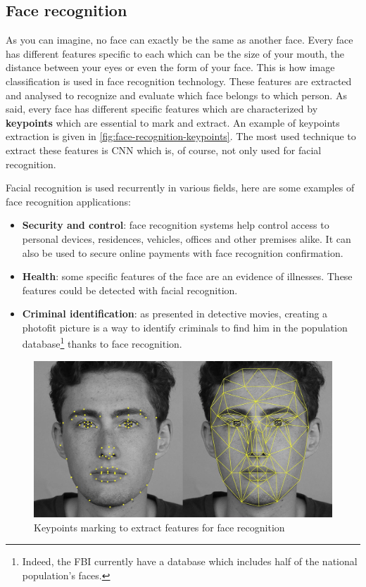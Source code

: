 \documentclass[11pt, openany]{report}
\theoremstyle{plain}
\theoremstyle{definition}
\theoremstyle{remark}
\begin{document}
\newpage
\subsection{Face recognition}
As you can imagine, no face can exactly be the same as another face. Every face has different features specific to each which can be the size of your mouth, the distance between your eyes or even the form of your face. This is how image classification is used in face recognition technology. These features are extracted and analysed to recognize and evaluate which face belongs to which person. As said, every face has different specific features which are characterized by \textbf{keypoints} which are essential to mark and extract. An example of keypoints extraction is given in \autoref{fig:face-recognition-keypoints}. The most used technique to extract these features is CNN which is, of course, not only used for facial recognition. 

Facial recognition is used recurrently in various fields, here are some examples of face recognition applications:  
\begin{itemize}
\item \textbf{Security and control}: face recognition systems help control access to personal devices, residences, vehicles, offices and other premises alike. It can also be used to secure online payments with face recognition confirmation. 
\item \textbf{Health}: some specific features of the face are an evidence of illnesses. These features could be detected with facial recognition. 
\item \textbf{Criminal identification}: as presented in detective movies, creating a photofit picture is a way to identify criminals to find him in the population database\footnote{Indeed, the FBI currently have a database which includes half of the national population's faces.} thanks to face recognition.    
\end{itemize}

\begin{figure}[h]
  \centering
  \includegraphics[scale=0.20]{figures/face-recognition-keypoints.jpeg}
  \caption{Keypoints marking to extract features for face recognition \cite{Face-Recognition-1}}
  \label{fig:face-recognition-keypoints}
\end{figure}
\end{document}
